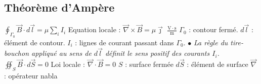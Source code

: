 \subsection{Théorème d'Ampère}
\begin{formules}
    {$\displaystyle\oint_{\Gamma_0}\vec B\cdot d\vec l = \mu\sum_i I_i$ \newline
     Equation locale : \newline
     $\vec\nabla\times\vec B = \mu\vec\jmath$}
    {$\frac{\mathrm{V\cdot s}}{\mathrm{m}}$}
    {
     $\Gamma_0$ : contour fermé. \newline
     $d\vec l$ : élément de contour. \newline
     $I_i$ : lignes de courant passant dans $\Gamma_0$. \newline
     $\bullet$ \textit{La règle du tire-bouchon appliqué au sens de $d\vec l$ définit le sens positif des courants $I_i$.}}
    {$\displaystyle\oiint_S \vec B\cdot d\vec S = 0$ \newline
     Loi locale : \newline
     $\vec\nabla\cdot\vec B = 0$}
    {}
    {
     $S$ : surface fermée \newline
     $d\vec S$ : élément de surface \newline
     $\vec\nabla$ : opérateur nabla}
\end{formules}

